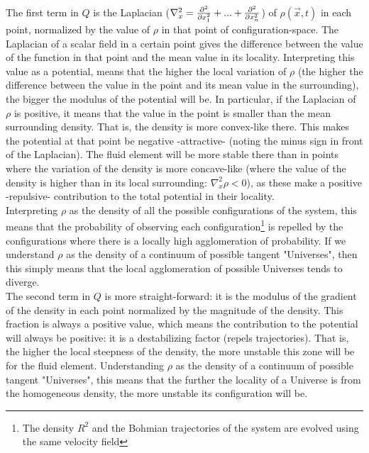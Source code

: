 \documentclass[11pt, a4paper]{article} %
\DeclareRobustCommand{\mybox}[2][gray!10]{%
\begin{tcolorbox}[   %
        left=0.2cm,
        right=0.2cm,
        top=0.15cm,
        bottom=0.15cm,
        colback=#1,
        colframe=#1,
        width=\dimexpr\textwidth\relax, 
        enlarge left by=0mm,
        boxsep=5pt,
        arc=0pt,outer arc=0pt,
        ]
        #2
\end{tcolorbox}
}
\begin{document}
\mybox{
The first term in $Q$ is the Laplacian ($\nabla_x^2 = \pdv[2]{}{x_1}+...+\pdv[2]{}{x_n}$) of $\rho(\vec{x},t)$ in each point, normalized by the value of $\rho$ in that point of configuration-space. The Laplacian of a scalar field in a certain point gives the difference between the value of the function in that point and the mean value in its locality. Interpreting this value as a potential, means that the higher the local variation of $\rho$ (the higher the difference between the value in the point and its mean value in the surrounding), the bigger the modulus of the potential will be. In particular, if the Laplacian of $\rho$ is positive, it means that the value in the point is smaller than the mean surrounding density. That is, the density is more convex-like there. This makes the potential at that point be negative -attractive- (noting the minus sign in front of the Laplacian). The fluid element will be more stable there than in points where the variation of the density is more concave-like (where the value of the density is higher than in its local surrounding: $\nabla_x^2 \rho<0$), as these make a positive -repulsive- contribution to the total potential in their locality.\\

Interpreting $\rho$ as the density of all the possible configurations of the system, this means that the probability of observing each configuration\footnote{ The density $R^2$ and the Bohmian trajectories of the system are evolved using the same velocity field} is repelled by the configurations where there is a locally high agglomeration of probability. If we understand $\rho$ as the density of a continuum of possible tangent "Universes", then this simply means that the local agglomeration of possible Universes tends to diverge.\\

The second term in $Q$ is more straight-forward: it is the modulus of the gradient of the density in each point normalized by the magnitude of the density. This fraction is always a positive value, which means the contribution to the potential will always be positive: it is a destabilizing factor (repels trajectories). That is, the higher the local steepness of the density, the more unstable this zone will be for the fluid element. Understanding $\rho$ as the density of a continuum of possible tangent "Universes", this means that the further the locality of a Universe is from the homogeneous density, the more unstable its configuration will be.
}
\end{document}
